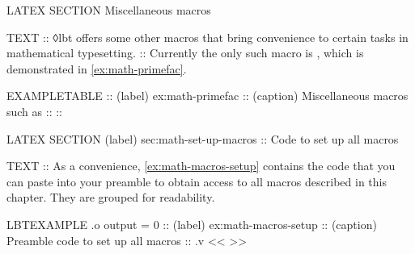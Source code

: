\begin{lbt}
    LATEX \FloatBarrier
    SECTION Miscellaneous macros

    TEXT
    :: ◊lbt offers some other macros that bring convenience to certain tasks in mathematical typesetting.
    :: Currently the only such macro is , which is demonstrated in \cref{ex:math-primefac}.

    EXAMPLETABLE
    :: (label) ex:math-primefac
    :: (caption) Miscellaneous macros such as 
    :: 
    :: 


    LATEX \FloatBarrier
    SECTION (label) sec:math-set-up-macros :: Code to set up all macros

    TEXT
    :: As a convenience, \cref{ex:math-macros-setup} contains the code that you can paste into your preamble to obtain access to all macros described in this chapter. They are grouped for readability.

    LBTEXAMPLE .o output = 0
    :: (label) ex:math-macros-setup
    :: (caption) Preamble code to set up all  macros
    :: .v <<
    >>




\end{lbt}
